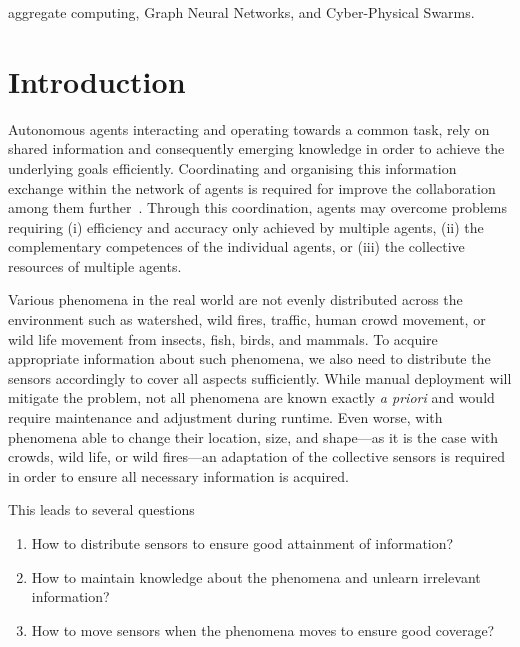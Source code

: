 \documentclass[conference]{IEEEtran}
\begin{document}
\begin{IEEEkeywords}
aggregate computing, Graph Neural Networks, and Cyber-Physical Swarms.
\end{IEEEkeywords}
%
\section{Introduction}

Autonomous agents interacting and operating towards a common task, rely on shared information and consequently emerging knowledge in order to achieve the underlying goals efficiently. Coordinating and organising this information exchange within the network of agents is required for improve the collaboration among them further~\cite{jennings1996coordination}. Through this coordination, agents may overcome problems requiring (i) efficiency and accuracy only achieved by multiple agents, (ii) the complementary competences of the individual agents, or (iii) the collective resources of multiple agents.  

Various phenomena in the real world are not evenly distributed across the environment such as watershed, wild fires, traffic, human crowd movement, or wild life movement from insects, fish, birds, and mammals.
To acquire appropriate information about such phenomena, we also need to distribute the sensors accordingly to cover all aspects sufficiently. While manual deployment will mitigate the problem, not all phenomena are known exactly \emph{a priori} and would require maintenance and adjustment during runtime. Even worse, with phenomena able to change their location, size, and shape---as it is the case with crowds, wild life, or wild fires---an adaptation of the collective sensors is required in order to ensure all necessary information is acquired. 

This leads to several questions 
\begin{enumerate}
	\item How to distribute sensors to ensure good attainment of information?
	\item How to maintain knowledge about the phenomena and unlearn irrelevant information?
	\item How to move sensors when the phenomena moves to ensure good coverage?
\end{enumerate} 
\end{document}
